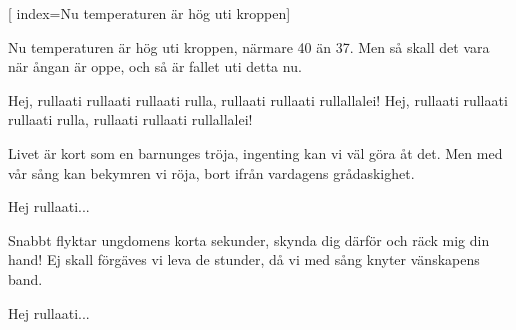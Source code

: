 [ 						
	index={Nu temperaturen är hög uti kroppen}]		
	
\beginverse*						
Nu temperaturen är hög uti kroppen, 
närmare 40 än 37.
 Men så skall det vara när ångan är oppe, 
och så är fallet uti detta nu. 
\endverse

\beginchorus				
Hej, rullaati rullaati rullaati rulla,
rullaati rullaati rullallalei! 
Hej, rullaati rullaati rullaati rulla,
rullaati rullaati rullallalei! 
\endchorus

\beginverse
Livet är kort som en barnunges tröja, 
ingenting kan vi väl göra åt det.
Men med vår sång kan bekymren vi röja, 
bort ifrån vardagens grådaskighet. 
\endverse	

\beginchorus
Hej rullaati...	
\endchorus

\beginverse
Snabbt flyktar ungdomens korta sekunder, 
skynda dig därför och räck mig din hand! 
Ej skall förgäves vi leva de stunder, 
då vi med sång knyter vänskapens band. 
\endverse	

\beginchorus
Hej rullaati...
\endchorus	
\endsong		
